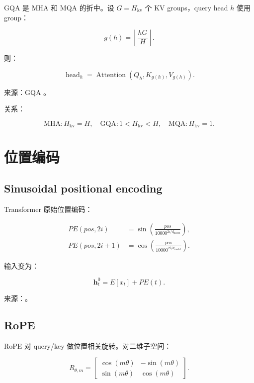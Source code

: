 \documentclass[UTF8,12pt]{ctexart}
\newcommand{\1}{\mathbf{1}}
\newcommand{\Attn}{\operatorname{Attention}}
\begin{document}
GQA 是 MHA 和 MQA 的折中。设 $G=H_{\mathrm{kv}}$ 个 KV groups，query head $h$ 使用 group：

\begin{equation}
g(h)=\left\lfloor \frac{hG}{H}\right\rfloor.
\end{equation}

则：

\begin{equation}
\operatorname{head}_h
=\Attn(Q_h,K_{g(h)},V_{g(h)}).
\end{equation}

来源：GQA \cite{ainslie2023gqa}。

关系：

\[
\text{MHA}:H_{\mathrm{kv}}=H,\quad
\text{GQA}:1<H_{\mathrm{kv}}<H,\quad
\text{MQA}:H_{\mathrm{kv}}=1.
\]

\section{位置编码}

\subsection{Sinusoidal positional encoding}

Transformer 原始位置编码：

\begin{align}
PE(pos,2i)
&=\sin\left(\frac{pos}{10000^{2i/d_{\mathrm{model}}}}\right),\\
PE(pos,2i+1)
&=\cos\left(\frac{pos}{10000^{2i/d_{\mathrm{model}}}}\right).
\end{align}

输入变为：

\begin{equation}
\bm{h}_t^0=E[x_t]+PE(t).
\end{equation}

来源：\cite{vaswani2017attention}。

\subsection{RoPE}

RoPE 对 query/key 做位置相关旋转。对二维子空间：

\begin{equation}
R_{\theta,m}
=
\begin{bmatrix}
\cos(m\theta)&-\sin(m\theta)\\
\sin(m\theta)&\cos(m\theta)
\end{bmatrix}.
\end{equation}
\end{document}
